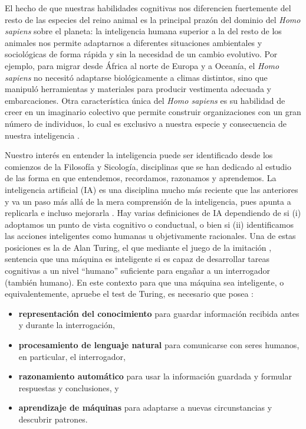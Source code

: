 El hecho de que nuestras habilidades cognitivas nos diferencien fuertemente del resto de las especies del reino animal es la principal prazón del dominio del \emph{Homo sapiens} sobre el planeta: la inteligencia humana superior a la del resto de los animales nos permite adaptarnos a diferentes situaciones ambientales y sociológicas de forma rápida y sin la necesidad de un cambio evolutivo. Por ejemplo, para migrar desde África al norte de Europa y a Oceanía, el \emph{Homo sapiens} no necesitó adaptarse biológicamente a climas distintos, sino que manipuló herramientas y materiales para producir vestimenta adecuada y embarcaciones. Otra característica única del \emph{Homo sapiens} es su habilidad de creer en un imaginario colectivo que permite construir organizaciones con un gran número de individuos, lo cual es exclusivo a nuestra especie y consecuencia de nuestra inteligencia \cite{harari}. 

Nuestro interés en entender la inteligencia puede ser identificado desde los comienzos de la Filosofía y Sicología, disciplinas que se han dedicado al estudio de las forma en que entendemos, recordamos, razonamos y aprendemos. La inteligencia artificial (IA) es una disciplina mucho más reciente que las anteriores y va un paso más allá de la mera comprensión de la inteligencia, pues apunta a replicarla e incluso mejorarla \cite{bostrom_2014}. Hay varias definiciones de IA dependiendo de si (i) adoptamos un punto de vista cognitivo o conductual, o bien si (ii) identificamos las acciones inteligentes como humanas u objetivamente racionales. Una de estas posiciones es la de Alan Turing, el que mediante el juego de la imitación \cite{turing_1950}, sentencia que una máquina es inteligente si es capaz de desarrollar tareas cognitivas a un nivel “humano” suficiente para engañar a un interrogador (también humano). En este contexto para que una máquina sea inteligente, o equivalentemente, apruebe el test de Turing, es necesario que posea \cite{russell_norvig_2009}:  
\begin{itemize}
	\item \textbf{representación del conocimiento} para guardar información recibida antes y durante la interrogación,
	\item \textbf{procesamiento de lenguaje natural} para comunicarse con seres humanos, en particular, el interrogador,
	\item \textbf{razonamiento automático} para usar la información guardada y formular respuestas y conclusiones, y
	\item \textbf{aprendizaje de máquinas} para adaptarse a nuevas circunstancias y descubrir patrones.
\end{itemize}


